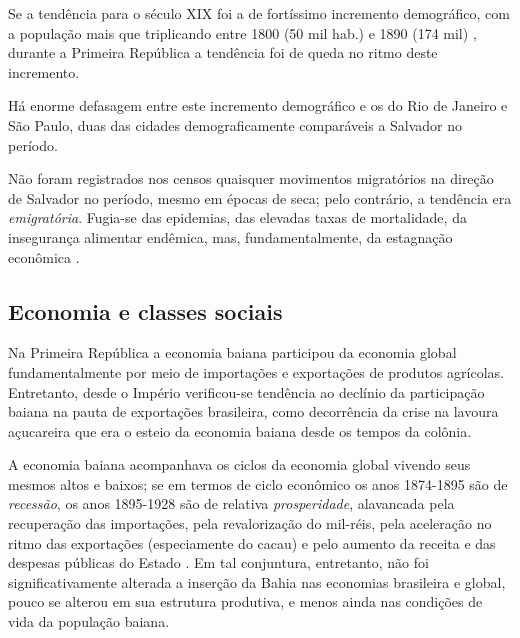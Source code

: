 Se a tendência para o século XIX foi a de fortíssimo incremento demográfico, com a população mais que triplicando entre 1800 (50 mil hab.) e 1890 (174 mil) \cite[p.~70]{sampaio_formas_1999}, durante a Primeira República a tendência foi de queda no ritmo deste incremento.



Há enorme defasagem entre este incremento demográfico e os do Rio de Janeiro e São Paulo, duas das cidades demograficamente comparáveis a Salvador no período.



Não foram registrados nos censos quaisquer movimentos migratórios na direção de Salvador no período, mesmo em épocas de seca; pelo contrário, a tendência era \textit{emigratória}. Fugia-se das epidemias, das elevadas taxas de mortalidade, da insegurança alimentar endêmica, mas, fundamentalmente, da estagnação econômica \cite{santos_repovo_2001}.

\subsection{Economia e classes sociais}\label{subsubsec:ecobasa}

Na Primeira República a economia baiana participou da economia global fundamentalmente por meio de importações e exportações de produtos agrícolas. Entretanto, desde o Império verificou-se tendência ao declínio da participação baiana na pauta de exportações brasileira, como decorrência da crise na lavoura açucareira que era o esteio da economia baiana desde os tempos da colônia.

A economia baiana acompanhava os ciclos da economia global vivendo seus mesmos altos e baixos; se em termos de ciclo econômico os anos 1874-1895 são de \textit{recessão}, os anos 1895-1928 são de relativa \textit{prosperidade}, alavancada pela recuperação das importações, pela revalorização do mil-réis, pela aceleração no ritmo das exportações (especiamente do cacau) e pelo aumento da receita e das despesas públicas do Estado \cite[p.~28-29]{CPE1980}. Em tal conjuntura, entretanto, não foi significativamente alterada a inserção da Bahia nas economias brasileira e global, pouco se alterou em sua estrutura produtiva, e menos ainda nas condições de vida da população baiana.

